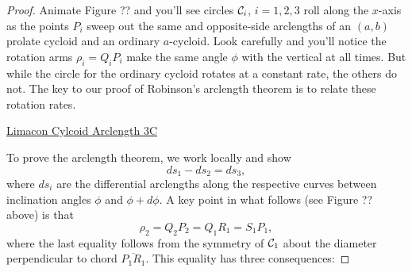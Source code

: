 \documentclass{ximera}
\begin{document}
\begin{proof}
Animate Figure ?? and you'll see circles ${\cal C}_i$, $i=1,2,3$ roll along the $x$-axis as the points $P_i$ sweep out the same and opposite-side arclengths of an $(a,b)$ prolate cycloid and an ordinary $a$-cycloid.  Look carefully and you'll notice the rotation arms $\rho_i = Q_iP_i$ make the same angle $\phi$ with the vertical at all times. But while the circle for the ordinary cycloid rotates at a constant rate, the others do not. The key to our proof of Robinson's arclength theorem is to relate these rotation rates. 






\begin{onlineOnly}
    \begin{center}
\end{center}
\end{onlineOnly}

\href{https://www.desmos.com/calculator/qtse3eivit}{Limacon Cylcoid Arclength 3C}

To prove the arclength theorem, we work locally and show
\begin{equation} \label{Eq:DiffArcs}
      ds_1 - ds_2 = ds_3 ,
\end{equation}
where  $ds_i$ are the differential arclengths along the respective curves between inclination angles $\phi$ and $\phi + d\phi$. 
A key point in what follows (see Figure ?? above) is that %
\[
   \rho_2 = Q_2P_2 = Q_1R_1 = S_1P_1 ,
\]
where the last equality follows from the symmetry of ${\cal C}_1$ about the diameter perpendicular to chord $\overline{P_1R_1}$. This equality has three consequences:


\end{proof}
\end{document}
